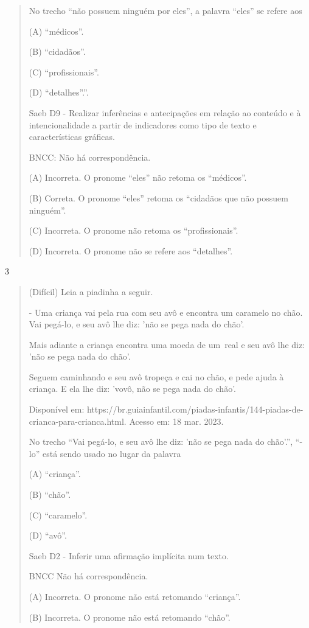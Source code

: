 \begin{escolha}
\begin{quote}
No trecho ``não possuem ninguém por eles'', a palavra ``eles'' se refere
aos

(A) ``médicos''.

(B) ``cidadãos''.

(C) ``profissionais''.

(D) ``detalhes''.''.

Saeb D9 - Realizar inferências e antecipações em relação ao conteúdo e à
intencionalidade a partir de indicadores como tipo de texto e
características gráficas.

BNCC: Não há correspondência.

(A) Incorreta. O pronome ``eles'' não retoma os ``médicos''.

(B) Correta. O pronome ``eles'' retoma os ``cidadãos que não possuem
ninguém''.

(C) Incorreta. O pronome não retoma os ``profissionais''.

(D) Incorreta. O pronome não se refere aos ``detalhes''.
\end{quote}

\num{3}

\begin{quote}
(Difícil) Leia a piadinha a seguir.

- Uma criança vai pela rua com seu avô e encontra um caramelo no chão.
Vai pegá-lo, e seu avô lhe diz: 'não se pega nada do chão'.

Mais adiante a criança encontra uma moeda de um~real e seu avô lhe diz:
'não se pega nada do chão'.~

Seguem caminhando e seu avô tropeça e cai no chão, e pede ajuda à
criança. E ela lhe diz: 'vovô, não se pega nada do chão'.

Disponível em:
https://br.guiainfantil.com/piadas-infantis/144-piadas-de-crianca-para-crianca.html.
Acesso em: 18 mar. 2023.

No trecho ``Vai pegá-lo, e seu avô lhe diz: 'não se pega nada do
chão'.'', ``-lo'' está sendo usado no lugar da palavra

(A) ``criança''.

(B) ``chão''.

(C) ``caramelo''.

(D) ``avô''.

Saeb D2 - Inferir uma afirmação implícita num texto.

BNCC Não há correspondência.

(A) Incorreta. O pronome não está retomando ``criança''.

(B) Incorreta. O pronome não está retomando ``chão''.


\end{quote}
\end{escolha}
